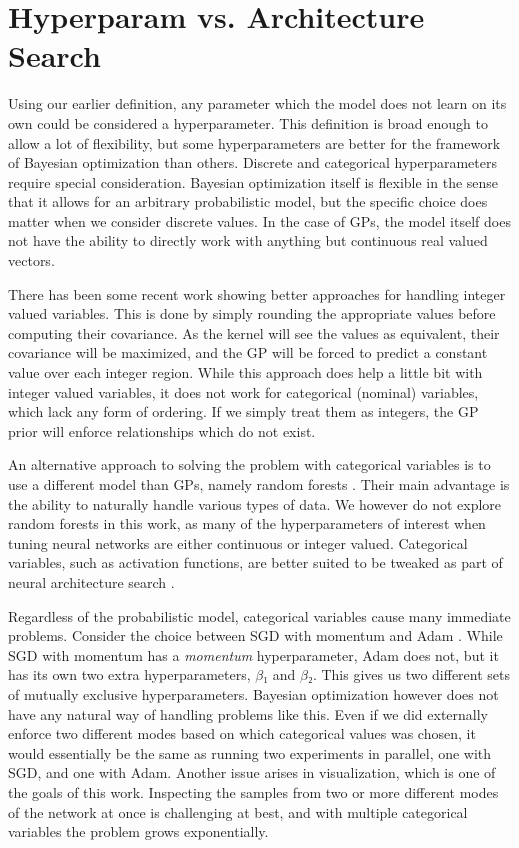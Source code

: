 \section{Hyperparam vs. Architecture Search}
\label{section:architecture-search}

Using our earlier definition, any parameter which the model does not learn on
its own could be considered a hyperparameter. This definition is broad enough
to allow a lot of flexibility, but some hyperparameters are better for the
framework of Bayesian optimization than others. Discrete and categorical
hyperparameters require special consideration. Bayesian optimization itself is
flexible in the sense that it allows for an arbitrary probabilistic model, but
the specific choice does matter when we consider discrete values. In the case
of GPs, the model itself does not have the ability to directly work with
anything but continuous real valued vectors.

There has been some recent work \citep{integer-valued-gp} showing better
approaches for handling integer valued variables. This is done by simply
rounding the appropriate values before computing their covariance. As the
kernel will see the values as equivalent, their covariance will be maximized,
and the GP will be forced to predict a constant value over each integer region.
While this approach does help a little bit with integer valued variables, it
does not work for categorical (nominal) variables, which lack any form of
ordering. If we simply treat them as integers, the GP prior will enforce
relationships which do not exist.

An alternative approach to solving the problem with categorical variables is to
use a different model than GPs, namely random forests
\citep{nando-bayesian-out-of-the-loop}. Their main advantage is the ability to
naturally handle various types of data. We however do not explore random
forests in this work, as many of the hyperparameters of interest when tuning
neural networks are either continuous or integer valued. Categorical variables,
such as activation functions, are better suited to be tweaked as part of neural
architecture search \citep{nasnet}.

Regardless of the probabilistic model, categorical variables cause many
immediate problems.  Consider the choice between SGD with momentum
\citep{overview-of-sgd} and Adam \citep{kingma2014adam}.  While SGD with
momentum has a \emph{momentum} hyperparameter, Adam does not, but it has its
own two extra hyperparameters, $β₁$ and $β₂$. This gives us two different sets
of mutually exclusive hyperparameters. Bayesian optimization however does not
have any natural way of handling problems like this. Even if we did externally
enforce two different modes based on which categorical values was chosen, it
would essentially be the same as running two experiments in parallel, one with
SGD, and one with Adam. Another issue arises in visualization, which is one of
the goals of this work. Inspecting the samples from two or more different modes
of the network at once is challenging at best, and with multiple categorical
variables the problem grows exponentially.

